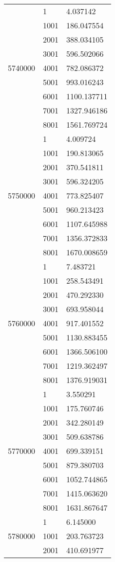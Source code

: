 \begin{table}[htb!]
\begin{tabular}{lll}
\multirow[c]{9}{*}{5740000} & 1 & 4.037142 \\
 & 1001 & 186.047554 \\
 & 2001 & 388.034105 \\
 & 3001 & 596.502066 \\
 & 4001 & 782.086372 \\
 & 5001 & 993.016243 \\
 & 6001 & 1100.137711 \\
 & 7001 & 1327.946186 \\
 & 8001 & 1561.769724 \\
\multirow[c]{9}{*}{5750000} & 1 & 4.009724 \\
 & 1001 & 190.813065 \\
 & 2001 & 370.541811 \\
 & 3001 & 596.324205 \\
 & 4001 & 773.825407 \\
 & 5001 & 960.213423 \\
 & 6001 & 1107.645988 \\
 & 7001 & 1356.372833 \\
 & 8001 & 1670.008659 \\
\multirow[c]{9}{*}{5760000} & 1 & 7.483721 \\
 & 1001 & 258.543491 \\
 & 2001 & 470.292330 \\
 & 3001 & 693.958044 \\
 & 4001 & 917.401552 \\
 & 5001 & 1130.883455 \\
 & 6001 & 1366.506100 \\
 & 7001 & 1219.362497 \\
 & 8001 & 1376.919031 \\
\multirow[c]{9}{*}{5770000} & 1 & 3.550291 \\
 & 1001 & 175.760746 \\
 & 2001 & 342.280149 \\
 & 3001 & 509.638786 \\
 & 4001 & 699.339151 \\
 & 5001 & 879.380703 \\
 & 6001 & 1052.744865 \\
 & 7001 & 1415.063620 \\
 & 8001 & 1631.867647 \\
\multirow[c]{9}{*}{5780000} & 1 & 6.145000 \\
 & 1001 & 203.763723 \\
 & 2001 & 410.691977 \\

\end{tabular}
\end{table}

